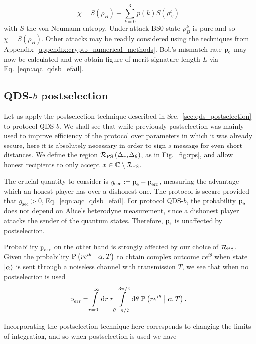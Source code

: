 \begin{equation}
\chi = S\left(\rho_B\right) - \sum_{k=0}^3 p\left(k\right) S\left(\rho_E^k\right)
\end{equation}
with $S$ the von Neumann entropy. Under attack BS$0$ state $\rho_B^k$ is pure and so $\chi = S\left(\rho_B\right)$. Other attacks may be readily considered using the techniques from Appendix~\ref{appendix:crypto_numerical_methods}. Bob's mismatch rate $\text{p}_{\text{e}}$ may now be calculated and we obtain figure of merit signature length $L$ via Eq.~\ref{eqn:aqc_qdsb_efail}.



\subsection{QDS-$b$ postselection}
Let us apply the postselection technique described in Sec.~\ref{sec:qds_postselection} to protocol QDS-$b$. We shall see that while previously postselection was mainly used to improve efficiency of the protocol over parameters in which it was already secure, here it is absolutely necessary in order to sign a message for even short distances. We define the region $\mathcal{R}_{\text{PS}}\left(\Delta_r, \Delta_\theta\right)$, as in Fig.~\ref{fig:rps}, and allow honest recipients to only accept $x \in \mathbb{C} \setminus \mathcal{R}_{\text{PS}}$. 

The crucial quantity to consider is $g_{\text{sec}} := \text{p}_{\text{e}} - \text{p}_{\text{err}}$, measuring the advantage which an honest player has over a dishonest one. The protocol is secure provided that $g_{\text{sec}} > 0$, Eq.~\ref{eqn:aqc_qdsb_efail}. For protocol QDS-$b$, the probability $\text{p}_{\text{e}}$ does not depend on Alice's heterodyne measurement, since a dishonest player attacks the sender of the quantum states. Therefore, $\text{p}_{\text{e}}$ is unaffected by postselection.

Probability $\text{p}_{\text{err}}$ on the other hand is strongly affected by our choice of $\mathcal{R}_{\text{PS}}$. Given the probability $\text{P}\left(r e^{i \theta} \; \middle| \; \alpha, T\right)$ to obtain complex outcome $r e^{i \theta}$ when state $\ket{\alpha}$ is sent through a noiseless channel with transmission $T$, we see that when no postselection is used
\begin{equation}
\text{p}_{\text{err}} = \int\limits_{r=0}^\infty \mathrm{d}r \; r \int\limits_{\theta = \pi/2}^{3\pi/2} \mathrm{d}\theta \; \text{P}\left(r e^{i \theta} \; \middle| \; \alpha, T\right).
\end{equation}

\noindent Incorporating the postselection technique here corresponds to changing the limits of integration, and so when postselection is used we have

